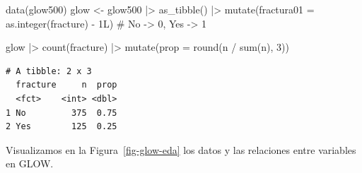 \documentclass[
  letterpaper,
  DIV=11,
  numbers=noendperiod]{scrartcl}
\newenvironment{Shaded}{\begin{snugshade}}{\end{snugshade}}
\newcommand{\AttributeTok}[1]{\textcolor[rgb]{0.40,0.45,0.13}{#1}}
\newcommand{\CommentTok}[1]{\textcolor[rgb]{0.37,0.37,0.37}{#1}}
\newcommand{\DecValTok}[1]{\textcolor[rgb]{0.68,0.00,0.00}{#1}}
\newcommand{\FunctionTok}[1]{\textcolor[rgb]{0.28,0.35,0.67}{#1}}
\newcommand{\NormalTok}[1]{\textcolor[rgb]{0.00,0.23,0.31}{#1}}
\newcommand{\OtherTok}[1]{\textcolor[rgb]{0.00,0.23,0.31}{#1}}
\newcommand{\SpecialCharTok}[1]{\textcolor[rgb]{0.37,0.37,0.37}{#1}}
\begin{document}
\begin{Shaded}
\begin{Highlighting}[]
\FunctionTok{data}\NormalTok{(glow500)}
\NormalTok{glow }\OtherTok{\textless{}{-}}\NormalTok{ glow500 }\SpecialCharTok{|\textgreater{}}
  \FunctionTok{as\_tibble}\NormalTok{() }\SpecialCharTok{|\textgreater{}}
  \FunctionTok{mutate}\NormalTok{(}\AttributeTok{fractura01 =} \FunctionTok{as.integer}\NormalTok{(fracture) }\SpecialCharTok{{-}}\NormalTok{ 1L)   }\CommentTok{\# No {-}\textgreater{} 0, Yes {-}\textgreater{} 1}

\NormalTok{glow }\SpecialCharTok{|\textgreater{}} \FunctionTok{count}\NormalTok{(fracture) }\SpecialCharTok{|\textgreater{}} \FunctionTok{mutate}\NormalTok{(}\AttributeTok{prop =} \FunctionTok{round}\NormalTok{(n }\SpecialCharTok{/} \FunctionTok{sum}\NormalTok{(n), }\DecValTok{3}\NormalTok{))}
\end{Highlighting}
\end{Shaded}

\begin{verbatim}
# A tibble: 2 x 3
  fracture     n  prop
  <fct>    <int> <dbl>
1 No         375  0.75
2 Yes        125  0.25
\end{verbatim}

Visualizamos en la Figura~\ref{fig-glow-eda} los datos y las relaciones
entre variables en GLOW.
\end{document}
